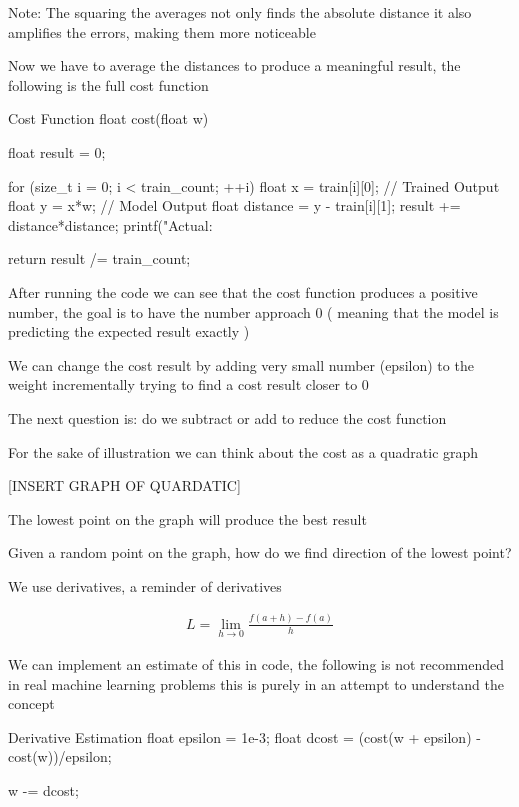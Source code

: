\documentclass{report}
\begin{document}
Note: The squaring the averages not only finds the absolute distance it also amplifies the errors, making them more noticeable


Now we have to average the distances to produce a meaningful result, the following is the full cost function


\begin{code}[language=c]{Cost Function}
float cost(float w){

    float result = 0;

    for (size_t i = 0; i < train_count; ++i) {
        float x  = train[i][0]; // Trained Output
        float y  = x*w;  // Model Output
        float distance = y - train[i][1];
        result += distance*distance;
        printf("Actual: %
    }

    return result /= train_count;

}
\end{code}



After running the code we can see that the cost function produces a positive number, the goal is to have the number approach 0 ( meaning that the model is predicting the expected result exactly )


We can change the cost result by adding very small number (epsilon) to the weight incrementally trying to find a cost result closer to 0


The next question is: do we subtract or add to reduce the cost function  


For the sake of illustration we can think about the cost as a quadratic graph

[INSERT GRAPH OF QUARDATIC]

The lowest point on the graph will produce the best result

Given a random point on the graph, how do we find direction of the lowest point? 

We use derivatives, a reminder of derivatives


\begin{align*}
    L = \lim_{h \to 0} \frac{f(a + h) - f(a)}{h}
\end{align*}


We can implement an estimate of this in code, the following is not recommended in real machine learning problems this is purely in an attempt to understand the concept


\begin{code}[language=c]{Derivative Estimation}
float epsilon = 1e-3;
float dcost = (cost(w + epsilon) - cost(w))/epsilon;

w -= dcost;
\end{code}









\end{document}
